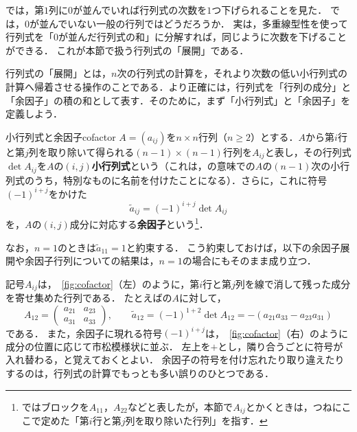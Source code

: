 では，第$1$列に$0$が並んでいれば行列式の次数を$1$つ下げられることを見た．
では，$0$が並んでいない一般の行列ではどうだろうか．
実は，多重線型性を使って行列式を「$0$が並んだ行列式の和」に分解すれば，同じように次数を下げることができる．
これが本節で扱う行列式の「展開」である．

行列式の「展開」とは，$n$次の行列式の計算を，それより次数の低い小行列式の計算へ帰着させる操作のことである．より正確には，行列式を「行列の成分」と「余因子」の積の和として表す．そのために，まず「小行列式」と「余因子」を定義しよう．

\begin{definition}{小行列式と余因子}{cofactor}
  $A = (a_{ij})$を$n \times n$行列（$n \geq 2$）とする．$A$から第$i$行と第$j$列を取り除いて得られる$(n-1) \times (n-1)$行列を$A_{ij}$と表し，その行列式$\det A_{ij}$を$A$の$(i,j)$\textbf{小行列式}という（これは，の意味での$A$の$(n-1)$次の小行列式のうち，特別なものに名前を付けたことになる）．さらに，これに符号$(-1)^{i+j}$をかけた
  \[
  \tilde{a}_{ij} = (-1)^{i+j} \det A_{ij}
  \]
  を，$A$の$(i,j)$成分に対応する\textbf{余因子}という\footnote{ではブロックを$A_{11}$，$A_{22}$などと表したが，本節で$A_{ij}$とかくときは，つねにここで定めた「第$i$行と第$j$列を取り除いた行列」を指す．}．

  なお，$n = 1$のときは$\tilde{a}_{11} = 1$と約束する．
  こう約束しておけば，以下の余因子展開や余因子行列についての結果は，$n = 1$の場合にもそのまま成り立つ．
\end{definition}

記号$A_{ij}$は，\figurename~\ref{fig:cofactor}（左）のように，第$i$行と第$j$列を線で消して残った成分を寄せ集めた行列である．
たとえばの$A$に対して，
\[
  A_{12} = \begin{pmatrix} a_{21} & a_{23} \\ a_{31} & a_{33} \end{pmatrix}, \qquad
  \tilde{a}_{12} = (-1)^{1+2}\det A_{12} = -(a_{21}a_{33} - a_{23}a_{31})
\]
である．
また，余因子に現れる符号$(-1)^{i+j}$は，\figurename~\ref{fig:cofactor}（右）のように成分の位置に応じて市松模様状に並ぶ．
左上を$+$とし，隣り合うごとに符号が入れ替わる，と覚えておくとよい．
余因子の符号を付け忘れたり取り違えたりするのは，行列式の計算でもっとも多い誤りのひとつである．

